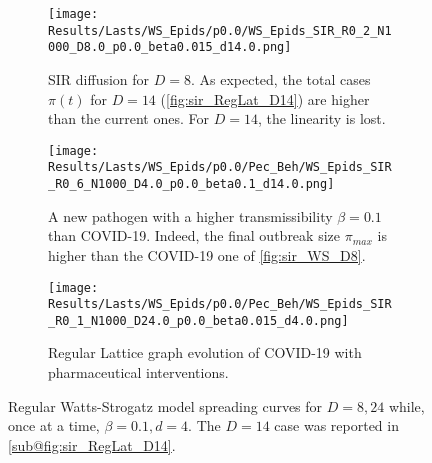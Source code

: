 \documentclass[a4paper,10pt,twoside]{book} %
\theoremstyle{definition}
\begin{document}

\begin{figure}[htbp]
    \centering
	\begin{subfigure}[t]{\textwidth}
        \centering
        \texttt{[image: Results/Lasts/WS\_Epids/p0.0/WS\_Epids\_SIR\_R0\_2\_N1000\_D8.0\_p0.0\_beta0.015\_d14.0.png]} 
        \caption{SIR diffusion for $ D = 8$. As expected, the total cases $ \pi(t)$ for $ D = 14$   (\autoref{fig:sir_RegLat_D14}) are higher than the current ones. For $ D = 14$, the linearity is lost.} 
		\label{fig:sir_WS_D8}
	\end{subfigure}
	\vfill
    \begin{subfigure}[t]{\textwidth}
        \centering
        \texttt{[image: Results/Lasts/WS\_Epids/p0.0/Pec\_Beh/WS\_Epids\_SIR\_R0\_6\_N1000\_D4.0\_p0.0\_beta0.1\_d14.0.png]} 
        \caption{A new pathogen with a higher transmissibility $ \beta = 0.1$ than COVID-19. Indeed, the final outbreak size $\pi_{max} $ is higher than the COVID-19 one of \autoref{fig:sir_WS_D8}.} 
		\label{fig:sir_WS_D5_b0.1}
    \end{subfigure}
	\vfill
    \begin{subfigure}[t]{\textwidth}
        \centering
        \texttt{[image: Results/Lasts/WS\_Epids/p0.0/Pec\_Beh/WS\_Epids\_SIR\_R0\_1\_N1000\_D24.0\_p0.0\_beta0.015\_d4.0.png]} 
        \caption{Regular Lattice graph evolution of COVID-19 with pharmaceutical interventions.} 
		\label{fig:sir_WS_D24_d4}
    \end{subfigure}
    \caption{Regular Watts-Strogatz model spreading curves for $D = 8, 24$ while, once at a time, $ \beta = 0.1, d = 4$. The $ D = 14$ case was reported in \autoref{sub@fig:sir_RegLat_D14}.}
	\label{fig:sir_WS_D5D5b0.1_D24d4}
\end{figure}

\clearpage
\end{document}
